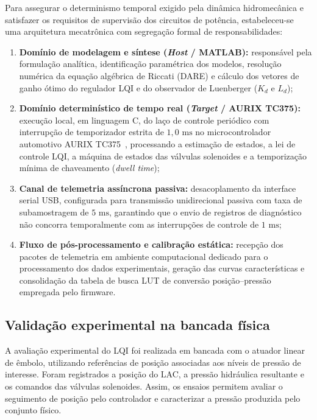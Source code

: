 Para assegurar o determinismo temporal exigido pela dinâmica hidromecânica e satisfazer os requisitos de supervisão dos circuitos de potência, estabeleceu-se uma arquitetura mecatrônica com segregação formal de responsabilidades:

\begin{enumerate}
    \item \textbf{Domínio de modelagem e síntese (\textit{Host} / MATLAB):} responsável pela formulação analítica, identificação paramétrica dos modelos, resolução numérica da equação algébrica de Riccati (DARE) e cálculo dos vetores de ganho ótimo do regulador LQI e do observador de Luenberger ($K_d$ e $L_d$);
    \item \textbf{Domínio determinístico de tempo real (\textit{Target} / AURIX TC375):} execução local, em linguagem C, do laço de controle periódico com interrupção de temporizador estrita de $1{,}0\text{ ms}$ no microcontrolador automotivo AURIX TC375~\cite{tc37xDatasheet, tc37xEvaluationBoard}, processando a estimação de estados, a lei de controle LQI, a máquina de estados das válvulas solenoides e a temporização mínima de chaveamento (\textit{dwell time});
    \item \textbf{Canal de telemetria assíncrona passiva:} desacoplamento da interface serial USB, configurada para transmissão unidirecional passiva com taxa de subamostragem de $5\text{ ms}$, garantindo que o envio de registros de diagnóstico não concorra temporalmente com as interrupções de controle de $1\text{ ms}$;
    \item \textbf{Fluxo de pós-processamento e calibração estática:} recepção dos pacotes de telemetria em ambiente computacional dedicado para o processamento dos dados experimentais, geração das curvas características e consolidação da tabela de busca \gls{LUT} de conversão posição--pressão empregada pelo firmware.
\end{enumerate}

\subsection{Validação experimental na bancada física}
\label{sec:validacao-experimental-bancada}

A avaliação experimental do LQI foi realizada em bancada com o atuador linear de êmbolo, utilizando referências de posição associadas aos níveis de pressão de interesse. Foram registrados a posição do LAC, a pressão hidráulica resultante e os comandos das válvulas solenoides. Assim, os ensaios permitem avaliar o seguimento de posição pelo controlador e caracterizar a pressão produzida pelo conjunto físico.

